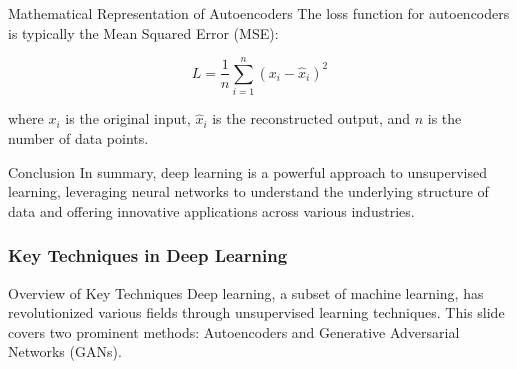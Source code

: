 \documentclass[aspectratio=169]{beamer}
\begin{document}
\begin{frame}[fragile]{Mathematical Representation of Autoencoders}
    The loss function for autoencoders is typically the Mean Squared Error (MSE):

    \begin{equation}
        L = \frac{1}{n} \sum_{i=1}^{n} (x_i - \hat{x}_i)^2
    \end{equation}

    where $x_i$ is the original input, $\hat{x}_i$ is the reconstructed output, and $n$ is the number of data points.
\end{frame}

\begin{frame}[fragile]{Conclusion}
    In summary, deep learning is a powerful approach to unsupervised learning, leveraging neural networks to understand the underlying structure of data and offering innovative applications across various industries.
\end{frame}

\begin{frame}[fragile]
    \frametitle{Key Techniques in Deep Learning}
    \begin{block}{Overview of Key Techniques}
        Deep learning, a subset of machine learning, has revolutionized various fields through unsupervised learning techniques. This slide covers two prominent methods: Autoencoders and Generative Adversarial Networks (GANs).
    \end{block}
\end{frame}
\end{document}
